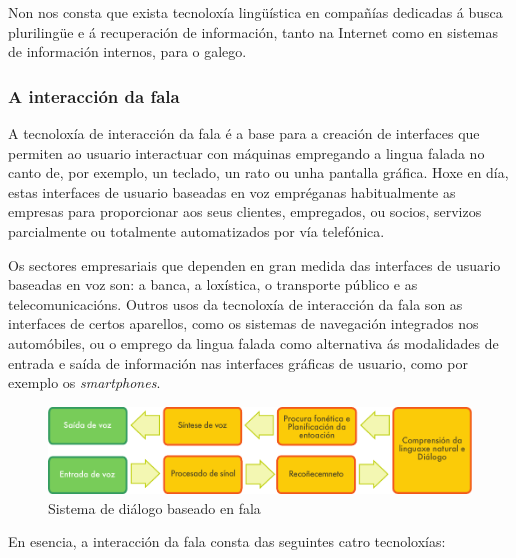\begin{multicols}{2}

Non nos consta que exista tecnoloxía lingüística en compañías dedicadas á busca plurilingüe e á recuperación de información, tanto na Internet como en sistemas de información internos, para o galego. 

\subsubsection{A interacción da fala}

A tecnoloxía de interacción da fala é a base para a creación de interfaces que permiten ao usuario interactuar con máquinas empregando a lingua falada no canto de, por exemplo, un teclado, un rato ou unha pantalla gráfica. Hoxe en día, estas interfaces de usuario baseadas en voz empréganas habitualmente as empresas para proporcionar aos seus clientes, empregados, ou socios, servizos parcialmente ou totalmente automatizados por vía telefónica. 

Os sectores empresariais que dependen en gran medida das interfaces de usuario baseadas en voz son: a banca, a loxística, o transporte público e as telecomunicacións. Outros usos da tecnoloxía de interacción da fala son as interfaces de certos aparellos, como os sistemas de navegación integrados nos automóbiles, ou o emprego da lingua falada como alternativa ás modalidades de entrada e saída de información nas interfaces gráficas de usuario, como por exemplo os \textit{smartphones}.


\begin{figure}[htb]
  \center
  \includegraphics[width=\textwidth]{../_media/galician/simple_speech-based_dialogue_architecture}
  \caption{Sistema de diálogo baseado en fala}
  \label{fig:dialoguearch_ga}
\end{figure}

En esencia, a interacción da fala consta das seguintes catro tecnoloxías: 


\end{multicols}
